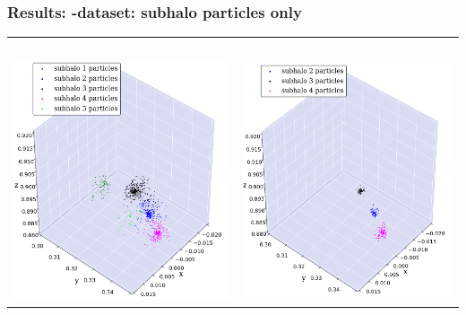 \begin{frame}
	\frametitle{Results: \cosmo-dataset: subhalo particles only}
	
	\begin{tabular}{c c}
		\simple\ 	& \neigh \\[1.5em]
		{\includegraphics[width = .49\textwidth]{../report/images/cosmo/cos-halo-66858-subhalo-only-nosaddle.png}} \hspace*{-1em} 	& 
		{\includegraphics[width = .49\textwidth]{../report/images/cosmo/cos-halo-66858-subhalo-only-saddle.png}}
	\end{tabular}
\end{frame}